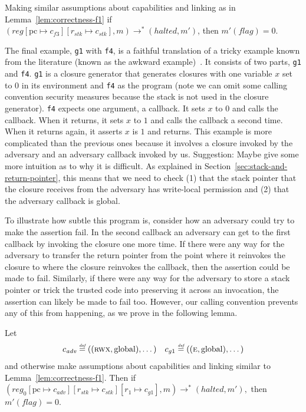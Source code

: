 \documentclass[format=acmsmall, review=false, screen=true]{acmart}
\renewcommand{\sectionname}{Section}
\newcommand{\update}[2]{[#1 \mapsto #2]}
\newcommand{\defeq}{\stackrel{\textit{\tiny{def}}}{=}}
\newcommand{\var}[1]{\mathit{#1}}
\newcommand{\pcreg}{\mathrm{pc}}
\newcommand{\reg}{\var{reg}}
\newcommand{\adv}{\var{adv}}
\newcommand{\stk}{\var{stk}}
\newcommand{\flag}{\var{flag}}
\newcommand{\halted}{\mathit{halted}}
\newcommand{\plainperm}[1]{\textsc{#1}}
\newcommand{\entry}{\plainperm{e}}
\newcommand{\rwx}{\plainperm{rwx}}
\newcommand{\plainlocality}[1]{\mathrm{#1}}
\newcommand{\glob}{\plainlocality{global}}
\newcommand{\step}[1][]{\rightarrow_{#1}}
\newcommand{\itoplassug}[1]
    {{\color{Blue} #1}}
\begin{document}
\begin{lemma}
  \label{lem:correctness-f3}
  Making similar assumptions about capabilities and linking as in
  Lemma~\ref{lem:correctness-f1}
  if $(\reg\update{\pcreg}{c_{f3}}\update{r_\stk}{c_\stk},m) \step^*
  (\halted,m')$, then $m'(\flag) = 0$.
\end{lemma}

The final example, \texttt{\footnotesize{g1}} with \texttt{\footnotesize{f4}},
is a faithful translation of a tricky example known from the literature (known
as the awkward example)~\citep{pitts_operational_1998,Dreyer:jfp12}. It consists
of two parts, \texttt{\footnotesize{g1}} and \texttt{\footnotesize{f4}}.
\texttt{\footnotesize{g1}} is a closure generator that generates closures with
one variable $x$ set to $0$ in its environment and \texttt{\footnotesize{f4}} as
the program (note we can omit some calling convention security measures because
the stack is not used in the closure generator). \texttt{\footnotesize{f4}}
expects one argument, a callback. It sets $x$ to $0$ and calls the callback.
When it returns, it sets $x$ to $1$ and calls the callback a second time. When
it returns again, it asserts $x$ is $1$ and returns. This example is more
complicated than the previous ones because it involves a closure invoked by the
adversary and an adversary callback invoked by us.
\itoplassug{
  Suggestion: Maybe give some more intuition as to why it is difficult.
}
As explained in
\sectionname~\ref{sec:stack-and-return-pointer}, this means that we need to check (1)
that the stack pointer that the closure receives from the adversary has
write-local permission and (2) that the adversary callback is global.

To illustrate how subtle this program is, consider how an adversary could try to
make the assertion fail. In the second callback an adversary can get to the
first callback by invoking the closure one more time. If there were any way for
the adversary to transfer the return pointer from the point where it reinvokes
the closure to where the closure reinvokes the callback, then the assertion
could be made to fail. Similarly, if there were any way for the adversary to
store a stack pointer or trick the trusted code into preserving it across an
invocation, the assertion can likely be made to fail too. However, our calling
convention prevents any of this from happening, as we prove in the following
lemma.

\begin{lemma}
  \label{lem:correctness-g1}
  Let
\[
    \begin{array}{r@{}lr@{}l}
    c_{\var{adv}} & \;\defeq ((\rwx,\glob),\dots) & c_{g1} & \;\defeq ((\entry,\glob),\dots)
    \end{array}
\]
  and otherwise make assumptions about capabilities and linking similar to Lemma~\ref{lem:correctness-f1}.
  Then if $
  (\reg_0\update{\pcreg}{c_\adv}\update{r_\stk}{c_\stk}\update{r_1}{c_{g1}},m) \step^* (\halted,m'),$
  then $m'(\flag) = 0$.
\end{lemma}
\end{document}

